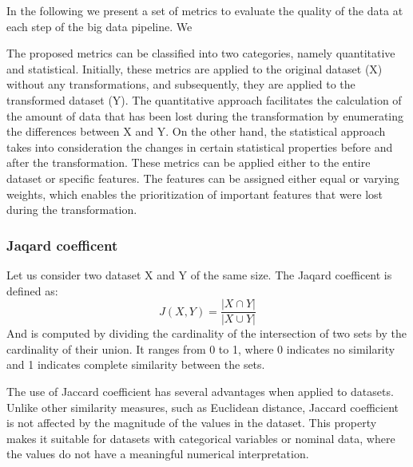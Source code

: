 In the following we present a set of metrics to evaluate the quality of the data at each step of the big data pipeline.
We

The proposed metrics can be classified into two categories, namely quantitative and statistical.
Initially, these metrics are applied to the original dataset (X) without any transformations, and subsequently, they are applied to the transformed dataset (Y).
The quantitative approach facilitates the calculation of the amount of data that has been lost during the transformation by enumerating the differences between X and Y.
On the other hand, the statistical approach takes into consideration the changes in certain statistical properties before and after the transformation.
These metrics can be applied either to the entire dataset or specific features.
The features can be assigned either equal or varying weights, which enables the prioritization of important features that were lost during the transformation.


\subsubsection{Jaqard coefficent}
Let us consider two dataset X and Y of the same size.
The Jaqard coefficent is defined as:\[J(X,Y) = \frac{|X \cap Y|}{|X \cup Y|}\]
And is computed by dividing the cardinality of the intersection of two sets by the cardinality of their union.
It ranges from 0 to 1, where 0 indicates no similarity and 1 indicates complete similarity between the sets.

The use of Jaccard coefficient has several advantages when applied to datasets.
Unlike other similarity measures, such as Euclidean distance, Jaccard coefficient is not affected by the magnitude of the values in the dataset.
This property makes it suitable for datasets with categorical variables or nominal data, where the values do not have a meaningful numerical interpretation.


